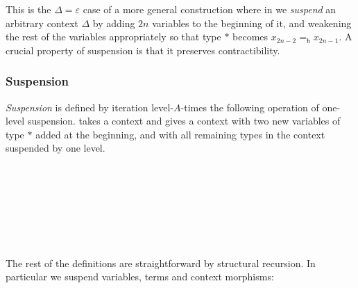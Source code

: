 This is the $\Delta = \varepsilon$ case of a more general construction
where in we \emph{suspend} an arbitrary context $\Delta$ by adding $2n$
variables to the beginning of it, and weakening the rest of the
variables appropriately so that type $*$ becomes $x_{2n-2} =_\mathsf{h}
x_{2n-1}$. A crucial property of suspension is that it preserves
contractibility. 


\subsubsection{Suspension}
\label{sec:susp}

\emph{Suspension} is defined by iteration level-$A$-times the following
operation of one-level suspension.  takes a
context and gives a context with two new variables of type $*$ added
at the beginning, and with all remaining types in the context suspended
by one level. 

\begin{code}\>\<%
\\
\> \AgdaSymbol{:}   \<%
\\
\> \AgdaSymbol{:} \AgdaSymbol{\}}      \AgdaSymbol{(} \AgdaSymbol{)}\<%
\\
%
\\
\>  \<[12]%
\>[12]\AgdaSymbol{=}  \AgdaInductiveConstructor{,} \AgdaInductiveConstructor{*} \AgdaInductiveConstructor{,} \AgdaInductiveConstructor{*}\<%
\\
\> \AgdaSymbol{(} \AgdaInductiveConstructor{,} \AgdaSymbol{)} \<[12]%
\>[12]\AgdaSymbol{=}   \AgdaInductiveConstructor{,}  \<%
\\
\>\<\end{code}
\noindent The rest of the definitions are straightforward by structural
recursion. In particular we suspend variables, terms and context morphisms:

